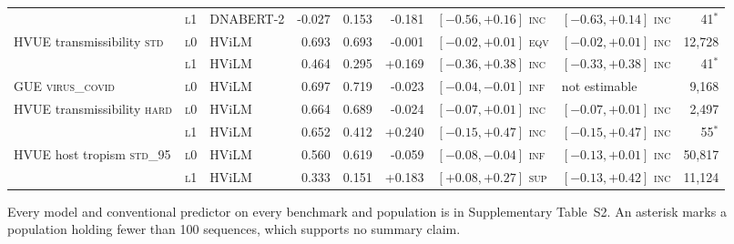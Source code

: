 \begin{longtable}{ll l rr r ll r}
 & \textsc{l1} & DNABERT-2 & -0.027 & 0.153 & -0.181 & $[-0.56, +0.16]$ \textsc{inc} & $[-0.63, +0.14]$ \textsc{inc} & 41$^{*}$ \\
\addlinespace
HVUE transmissibility \textsc{std} & \textsc{l0} & HViLM & 0.693 & 0.693 & -0.001 & $[-0.02, +0.01]$ \textsc{eqv} & $[-0.02, +0.01]$ \textsc{inc} & 12,728 \\
 & \textsc{l1} & HViLM & 0.464 & 0.295 & +0.169 & $[-0.36, +0.38]$ \textsc{inc} & $[-0.33, +0.38]$ \textsc{inc} & 41$^{*}$ \\
\addlinespace
GUE \textsc{virus\_covid} & \textsc{l0} & HViLM & 0.697 & 0.719 & -0.023 & $[-0.04, -0.01]$ \textsc{inf} & not estimable & 9,168 \\
\addlinespace
HVUE transmissibility \textsc{hard} & \textsc{l0} & HViLM & 0.664 & 0.689 & -0.024 & $[-0.07, +0.01]$ \textsc{inc} & $[-0.07, +0.01]$ \textsc{inc} & 2,497 \\
 & \textsc{l1} & HViLM & 0.652 & 0.412 & +0.240 & $[-0.15, +0.47]$ \textsc{inc} & $[-0.15, +0.47]$ \textsc{inc} & 55$^{*}$ \\
\addlinespace
HVUE host tropism \textsc{std\_95} & \textsc{l0} & HViLM & 0.560 & 0.619 & -0.059 & $[-0.08, -0.04]$ \textsc{inf} & $[-0.13, +0.01]$ \textsc{inc} & 50,817 \\
 & \textsc{l1} & HViLM & 0.333 & 0.151 & +0.183 & $[+0.08, +0.27]$ \textsc{sup} & $[-0.13, +0.42]$ \textsc{inc} & 11,124 \\
\bottomrule
\end{longtable}
\vspace{-8pt}\par\noindent\footnotesize Every model and conventional predictor on every benchmark and population is in Supplementary Table~S2. An asterisk marks a population holding fewer than 100 sequences, which supports no summary claim.
\endgroup
